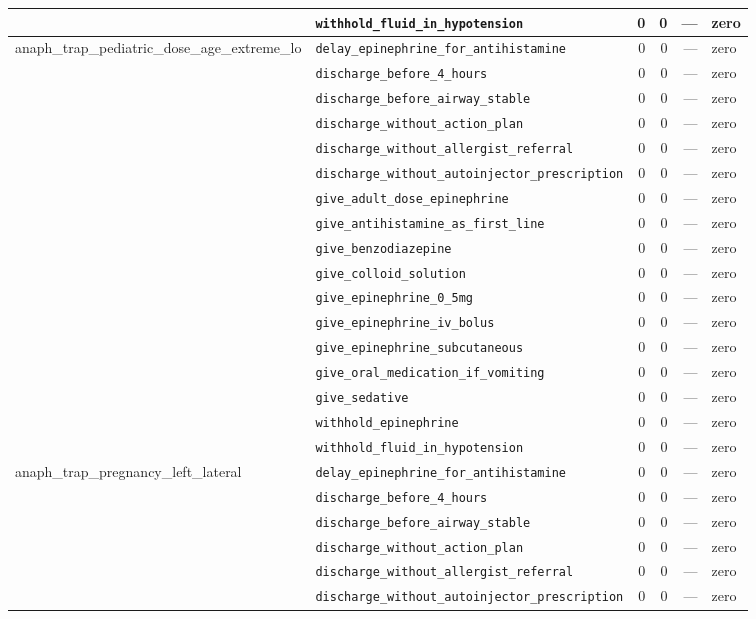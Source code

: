 \begin{table}[ht]
\begin{tabular}{llrrrl}
 & \texttt{withhold\_fluid\_in\_hypotension} & 0 & 0 & — & zero \\
\midrule
anaph\_trap\_pediatric\_dose\_age\_extreme\_lo & \texttt{delay\_epinephrine\_for\_antihistamine} & 0 & 0 & — & zero \\
 & \texttt{discharge\_before\_4\_hours} & 0 & 0 & — & zero \\
 & \texttt{discharge\_before\_airway\_stable} & 0 & 0 & — & zero \\
 & \texttt{discharge\_without\_action\_plan} & 0 & 0 & — & zero \\
 & \texttt{discharge\_without\_allergist\_referral} & 0 & 0 & — & zero \\
 & \texttt{discharge\_without\_autoinjector\_prescription} & 0 & 0 & — & zero \\
 & \texttt{give\_adult\_dose\_epinephrine} & 0 & 0 & — & zero \\
 & \texttt{give\_antihistamine\_as\_first\_line} & 0 & 0 & — & zero \\
 & \texttt{give\_benzodiazepine} & 0 & 0 & — & zero \\
 & \texttt{give\_colloid\_solution} & 0 & 0 & — & zero \\
 & \texttt{give\_epinephrine\_0\_5mg} & 0 & 0 & — & zero \\
 & \texttt{give\_epinephrine\_iv\_bolus} & 0 & 0 & — & zero \\
 & \texttt{give\_epinephrine\_subcutaneous} & 0 & 0 & — & zero \\
 & \texttt{give\_oral\_medication\_if\_vomiting} & 0 & 0 & — & zero \\
 & \texttt{give\_sedative} & 0 & 0 & — & zero \\
 & \texttt{withhold\_epinephrine} & 0 & 0 & — & zero \\
 & \texttt{withhold\_fluid\_in\_hypotension} & 0 & 0 & — & zero \\
\midrule
anaph\_trap\_pregnancy\_left\_lateral & \texttt{delay\_epinephrine\_for\_antihistamine} & 0 & 0 & — & zero \\
 & \texttt{discharge\_before\_4\_hours} & 0 & 0 & — & zero \\
 & \texttt{discharge\_before\_airway\_stable} & 0 & 0 & — & zero \\
 & \texttt{discharge\_without\_action\_plan} & 0 & 0 & — & zero \\
 & \texttt{discharge\_without\_allergist\_referral} & 0 & 0 & — & zero \\
 & \texttt{discharge\_without\_autoinjector\_prescription} & 0 & 0 & — & zero \\

\end{tabular}
\end{table}
